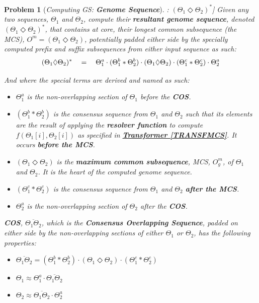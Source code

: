 \documentclass[a4paper, 18pt]{book} %
\newtheorem{prob}{Problem}
\begin{document}
\begin{prob}[\textit{Computing GS: \textbf{Genome Sequence}}]: $(\Theta_1 \Diamond \Theta_2)^*$] 
\label{PROBGS}
Given any two sequences, $\Theta_1$ and $\Theta_2$, compute their \textbf{resultant genome sequence}, denoted $(\Theta_1 \Diamond \Theta_2)^*$, that contains at core, their longest common subsequence (the MCS), $O^m = (\Theta_1 \Diamond \Theta_2)$, potentially padded either side by the specially computed prefix and suffix subsequences from either input sequence as such:\\

\begin{equation}
\label{EQGS}
(\Theta_1 \Diamond \Theta_2)^* \quad = \quad \Theta_1^a\cdot(\Theta_1^b \ast \Theta_2^b)\cdot(\Theta_1 \Diamond \Theta_2)\cdot(\Theta_1^c \ast \Theta_2^c)\cdot\Theta_2^a\\\\
\end{equation}

And where the special terms are derived and named as such:

\begin{itemize}
\item $\Theta_1^a$ is the non-overlapping section of $\Theta_1$ before the \textbf{COS}.
\item $(\Theta_1^b \ast \Theta_2^b)$ is the consensus sequence from $\Theta_1$ and $\Theta_2$ such that its elements are the result of applying the \textbf{resolver function} to compute $f(\Theta_1[i],\Theta_2[i])$ as specified in \textbf{\hyperref[TRANSFMCS]{Transformer \ref{TRANSFMCS}}}. It occurs \textbf{before the MCS}.
\item $(\Theta_1 \Diamond \Theta_2)$ is the \textbf{maximum common subsequence}, MCS, $O^m_g$, of $\Theta_1$ and $\Theta_2$. It is the heart of the computed genome sequence.
\item $(\Theta_1^c \ast \Theta_2^c)$ is the consensus sequence from $\Theta_1$ and $\Theta_2$ \textbf{after the MCS}.
\item  $\Theta_2^a$ is the non-overlapping section of $\Theta_2$ after the \textbf{COS}.
\end{itemize}

\textbf{COS}, $\overline{\Theta_1\Theta_2}$, which is the \textbf{Consensus Overlapping Sequence}, padded on either side by the non-overlapping sections of either $\Theta_1$ or $\Theta_2$, has the following properties:

\begin{itemize}
\item $\overline{\Theta_1\Theta_2} = (\Theta_1^b \ast \Theta_2^b)\cdot(\Theta_1 \Diamond \Theta_2)\cdot(\Theta_1^c \ast \Theta_2^c)$
\item $\Theta_1 \approx \Theta_1^a \cdot \overline{\Theta_1\Theta_2}$
\item $\Theta_2 \approx \overline{\Theta_1\Theta_2} \cdot \Theta_2^a$
\end{itemize}


\end{prob}
\end{document}
